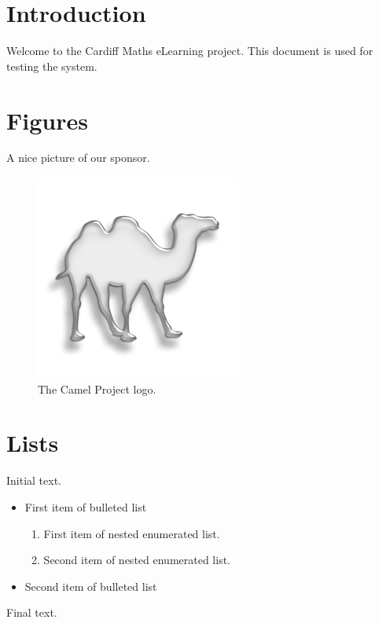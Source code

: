 \documentclass{camel}
\begin{document}
\makefrontmatter

\chapter{Introduction}\label{ch:intro}
Welcome to the Cardiff Maths eLearning project. This document is used for testing the system.


\chapter{Figures}\label{ch:figures}
A nice picture of our sponsor.

\begin{figure}[ht]
\centering
\includegraphics[scale=0.5]{camel_logo_reversed.png}
\caption{The Camel Project logo.}
\label{fig:camel-logo}
\end{figure}

\chapter{Lists}\label{ch:lists}

Initial text.
\begin{itemize}
\item First item of bulleted list
\begin{enumerate}
\item First item of nested enumerated list.
\item Second item of nested enumerated list.
\end{enumerate}
\item Second item of bulleted list
\end{itemize}
Final text.

\end{document}
